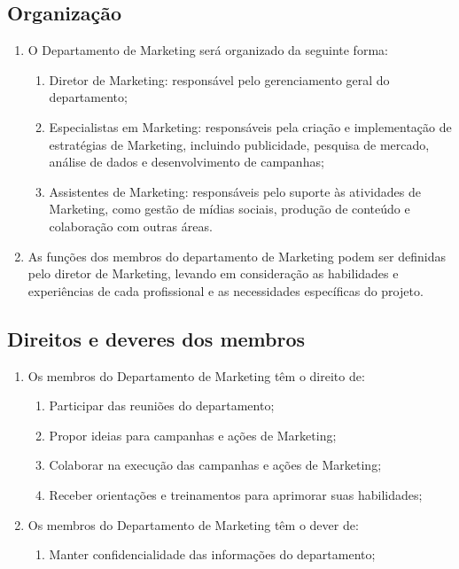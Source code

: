         \subsection{Organização}
            \begin{enumerate}
                \item O Departamento de Marketing será organizado da seguinte forma:
                \begin{enumerate}
                    \item Diretor de Marketing: responsável pelo gerenciamento geral do departamento;
                    \item Especialistas em Marketing: responsáveis pela criação e implementação de estratégias de Marketing, incluindo publicidade, pesquisa de mercado, análise de dados e desenvolvimento de campanhas;
                    \item Assistentes de Marketing: responsáveis pelo suporte às atividades de Marketing, como gestão de mídias sociais, produção de conteúdo e colaboração com outras áreas.
                \end{enumerate}
                \item As funções dos membros do departamento de Marketing podem ser definidas pelo diretor de Marketing, levando em consideração as habilidades e experiências de cada profissional e as necessidades específicas do projeto.
            \end{enumerate}
            
        \subsection{Direitos e deveres dos membros}
        \begin{enumerate}
            \item Os membros do Departamento de Marketing têm o direito de:
            \begin{enumerate}
                \item Participar das reuniões do departamento;
                \item Propor ideias para campanhas e ações de Marketing;
                \item Colaborar na execução das campanhas e ações de Marketing;
                \item Receber orientações e treinamentos para aprimorar suas habilidades;
            \end{enumerate} 
            \item  Os membros do Departamento de Marketing têm o dever de:
            \begin{enumerate}
                \item Manter  confidencialidade das informações do departamento;
            \end{enumerate}
        \end{enumerate}
        

